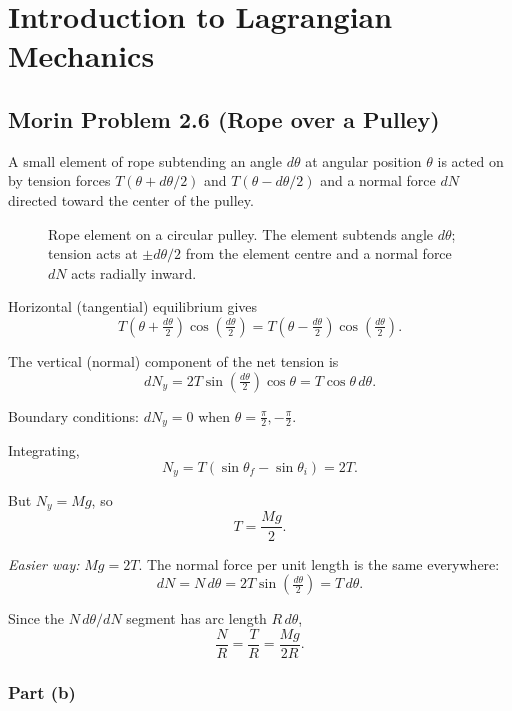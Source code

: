 
\chapter{Introduction to Lagrangian Mechanics}

\section{Morin Problem 2.6 (Rope over a Pulley)}

A small element of rope subtending an angle $d\theta$ at angular position $\theta$
is acted on by tension forces $T(\theta + d\theta/2)$ and $T(\theta - d\theta/2)$
and a normal force $dN$ directed toward the center of the pulley.

\begin{figure}[H]
    \centering
    \caption{Rope element on a circular pulley. The element subtends angle $d\theta$;
    tension acts at $\pm d\theta/2$ from the element centre and a normal force $dN$
    acts radially inward.}
\end{figure}

Horizontal (tangential) equilibrium gives
\[
    T\!\left(\theta + \tfrac{d\theta}{2}\right)\cos\!\left(\tfrac{d\theta}{2}\right)
    =
    T\!\left(\theta - \tfrac{d\theta}{2}\right)\cos\!\left(\tfrac{d\theta}{2}\right).
\]

The vertical (normal) component of the net tension is
\[
    dN_y = 2T\sin\!\left(\tfrac{d\theta}{2}\right)\cos\theta = T\cos\theta\,d\theta.
\]

Boundary conditions: $dN_y = 0$ when $\theta = \tfrac{\pi}{2}, -\tfrac{\pi}{2}$.

Integrating,
\[
    N_y = T(\sin\theta_f - \sin\theta_i) = 2T.
\]

But $N_y = Mg$, so
\[
    \boxed{T = \frac{Mg}{2}.}
\]

\textit{Easier way:} $Mg = 2T$.  The normal force per unit length is the same
everywhere:
\[
    dN = N\,d\theta = 2T\sin\!\left(\tfrac{d\theta}{2}\right) = T\,d\theta.
\]

Since the $N\,d\theta/dN$ segment has arc length $R\,d\theta$,
\[
    \boxed{\frac{N}{R} = \frac{T}{R} = \frac{Mg}{2R}.}
\]

\subsection*{Part (b)}

